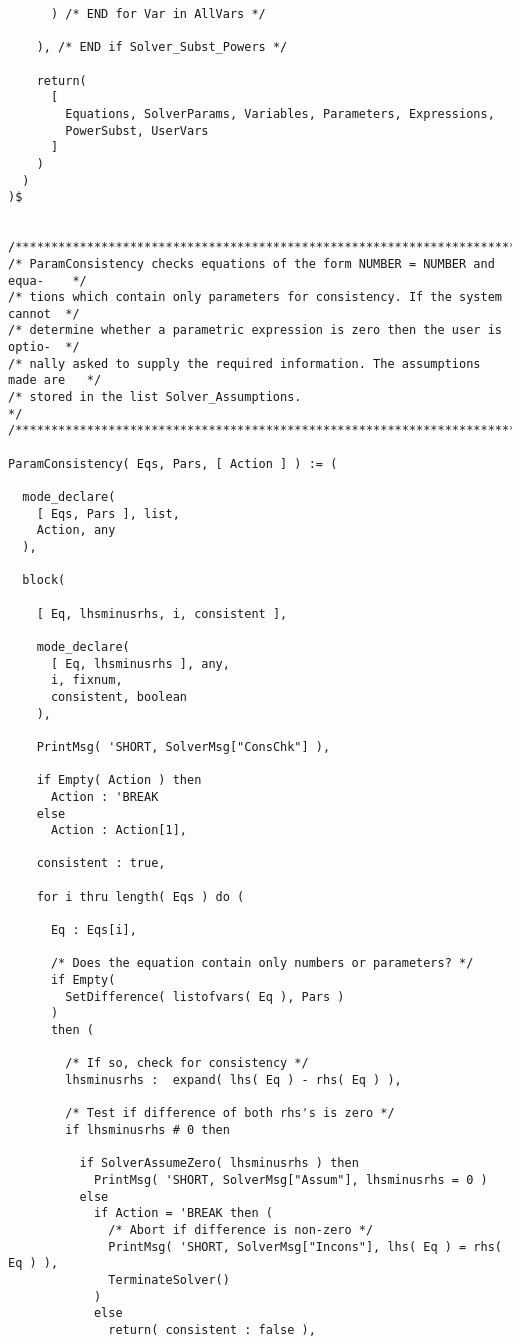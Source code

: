 \begin{verbatim}
      ) /* END for Var in AllVars */

    ), /* END if Solver_Subst_Powers */

    return(
      [
        Equations, SolverParams, Variables, Parameters, Expressions,
        PowerSubst, UserVars
      ]
    )
  )
)$


/******************************************************************************/
/* ParamConsistency checks equations of the form NUMBER = NUMBER and equa-    */
/* tions which contain only parameters for consistency. If the system cannot  */
/* determine whether a parametric expression is zero then the user is optio-  */
/* nally asked to supply the required information. The assumptions made are   */
/* stored in the list Solver_Assumptions.                                     */
/******************************************************************************/

ParamConsistency( Eqs, Pars, [ Action ] ) := (

  mode_declare(
    [ Eqs, Pars ], list,
    Action, any
  ),

  block(

    [ Eq, lhsminusrhs, i, consistent ],

    mode_declare(
      [ Eq, lhsminusrhs ], any,
      i, fixnum,
      consistent, boolean
    ),

    PrintMsg( 'SHORT, SolverMsg["ConsChk"] ),

    if Empty( Action ) then
      Action : 'BREAK
    else
      Action : Action[1],

    consistent : true,

    for i thru length( Eqs ) do (

      Eq : Eqs[i],

      /* Does the equation contain only numbers or parameters? */
      if Empty(
        SetDifference( listofvars( Eq ), Pars )
      )
      then (

        /* If so, check for consistency */
        lhsminusrhs :  expand( lhs( Eq ) - rhs( Eq ) ),

        /* Test if difference of both rhs's is zero */
        if lhsminusrhs # 0 then

          if SolverAssumeZero( lhsminusrhs ) then
            PrintMsg( 'SHORT, SolverMsg["Assum"], lhsminusrhs = 0 )
          else
            if Action = 'BREAK then (
              /* Abort if difference is non-zero */
              PrintMsg( 'SHORT, SolverMsg["Incons"], lhs( Eq ) = rhs( Eq ) ),
              TerminateSolver()
            )
            else
              return( consistent : false ),


\end{verbatim}
